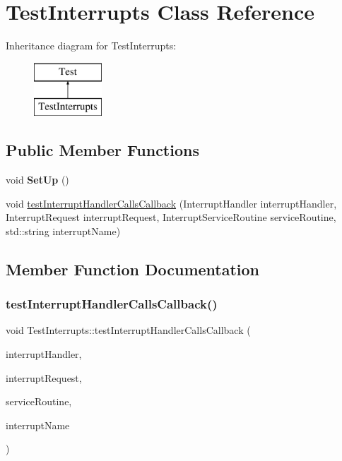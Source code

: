 \hypertarget{class_test_interrupts}{}\section{Test\+Interrupts Class Reference}
\label{class_test_interrupts}
Inheritance diagram for Test\+Interrupts\+:\begin{figure}[H]
\begin{center}
\leavevmode
\includegraphics[height=2.000000cm]{class_test_interrupts}
\end{center}
\end{figure}
\subsection*{Public Member Functions}
\begin{DoxyCompactItemize}
\item 
\mbox{\label{class_test_interrupts_a21921f75ea496b1bfdc5e4ed6d335db8}} 
void {\bfseries Set\+Up} ()
\item 
void \mbox{\hyperlink{class_test_interrupts_ab6080c1aab065f65cf6c7c6e4fd271a0}{test\+Interrupt\+Handler\+Calls\+Callback}} (Interrupt\+Handler interrupt\+Handler, Interrupt\+Request interrupt\+Request, Interrupt\+Service\+Routine service\+Routine, std\+::string interrupt\+Name)
\end{DoxyCompactItemize}


\subsection{Member Function Documentation}
\mbox{\label{class_test_interrupts_ab6080c1aab065f65cf6c7c6e4fd271a0}} 
\subsubsection{\texorpdfstring{testInterruptHandlerCallsCallback()}{testInterruptHandlerCallsCallback()}}
{\footnotesize\ttfamily void Test\+Interrupts\+::test\+Interrupt\+Handler\+Calls\+Callback (\begin{DoxyParamCaption}\item[{Interrupt\+Handler}]{interrupt\+Handler,  }\item[{Interrupt\+Request}]{interrupt\+Request,  }\item[{Interrupt\+Service\+Routine}]{service\+Routine,  }\item[{std\+::string}]{interrupt\+Name }\end{DoxyParamCaption})\hspace{0.3cm}{\ttfamily [inline]}}

